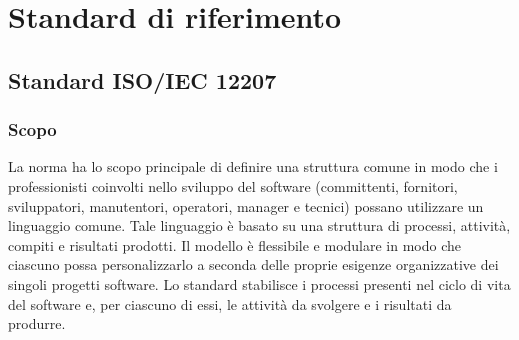 \appendix
\section{Standard di riferimento}
\subsection{Standard ISO/IEC 12207}
\subsubsection{Scopo}
La norma ha lo scopo principale di definire una struttura comune in modo che i professionisti coinvolti nello sviluppo del software (committenti, fornitori, sviluppatori, manutentori, operatori, manager e tecnici) possano utilizzare un linguaggio comune. Tale linguaggio è basato su una struttura di processi, attività, compiti e risultati prodotti. Il modello è flessibile e modulare in modo che ciascuno possa personalizzarlo a seconda delle proprie esigenze organizzative dei singoli progetti software.
Lo standard stabilisce i processi presenti nel ciclo di vita del software e, per ciascuno di essi, le attività da svolgere e i risultati da produrre.
